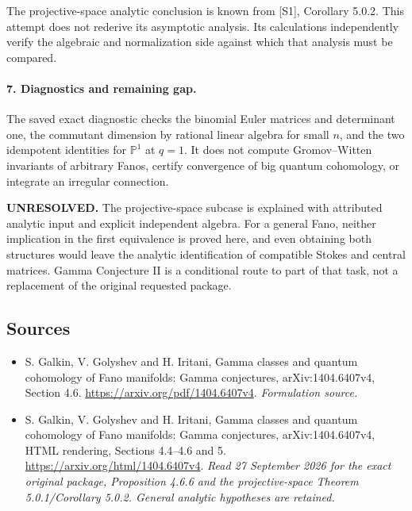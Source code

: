 \documentclass[11pt]{article}
\begin{document}
The projective-space analytic conclusion is known from [S1], Corollary 5.0.2. This attempt does not rederive its asymptotic analysis. Its calculations independently verify the algebraic and normalization side against which that analysis must be compared.

\paragraph{7. Diagnostics and remaining gap.}
The saved exact diagnostic checks the binomial Euler matrices and determinant one, the commutant dimension by rational linear algebra for small $n$, and the two idempotent identities for $\mathbb P^1$ at $q=1$. It does not compute Gromov--Witten invariants of arbitrary Fanos, certify convergence of big quantum cohomology, or integrate an irregular connection.

\textbf{UNRESOLVED.} The projective-space subcase is explained with attributed analytic input and explicit independent algebra. For a general Fano, neither implication in the first equivalence is proved here, and even obtaining both structures would leave the analytic identification of compatible Stokes and central matrices. Gamma Conjecture II is a conditional route to part of that task, not a replacement of the original requested package.

\subsection{Sources}
\begin{itemize}
\item[S1]S. Galkin, V. Golyshev and H. Iritani, Gamma classes and quantum cohomology of Fano manifolds: Gamma conjectures, arXiv:1404.6407v4, Section 4.6.
\url{https://arxiv.org/pdf/1404.6407v4}.
\textit{Formulation source.}
\item[E1]S. Galkin, V. Golyshev and H. Iritani, Gamma classes and quantum cohomology of Fano manifolds: Gamma conjectures, arXiv:1404.6407v4, HTML rendering, Sections 4.4--4.6 and 5.
\url{https://arxiv.org/html/1404.6407v4}.
\textit{Read 27 September 2026 for the exact original package, Proposition 4.6.6 and the projective-space Theorem 5.0.1/Corollary 5.0.2. General analytic hypotheses are retained.}
\end{itemize}
\end{document}
